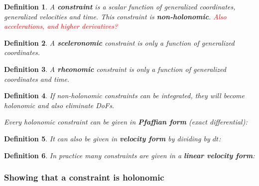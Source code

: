 \documentclass[10pt,a4paper]{scrartcl}
\newtheorem{define}{Definition}
\begin{document}
\begin{multicols*}{2}
\begin{define}
A \textbf{constraint} is a scalar function of generalized coordinates, generalized velocities and time. This constraint is \textbf{non-holonomic}.
\textcolor{red}{Also accelerations, and higher derivatives?}

\end{define}

\begin{define}
A \textbf{sceleronomic} constraint is only a function of generalized coordinates.

\end{define}

\begin{define}
A \textbf{rheonomic} constraint is only a function of generalized coordinates and time.

\end{define}

\begin{define}
If non-holonomic constraints can be integrated, they will become holonomic and also eliminate DoFs.

Every holonomic constraint can be given in \textbf{Pfaffian form} (exact differential):

\end{define}

\begin{define}
It can also be given in \textbf{velocity form} by dividing by $dt$:

\end{define}

\begin{define}
In practice many constraints are given in a \textbf{linear velocity form}:

\end{define}

\subsubsection{Showing that a constraint is holonomic}


\end{multicols*}
\end{document}
